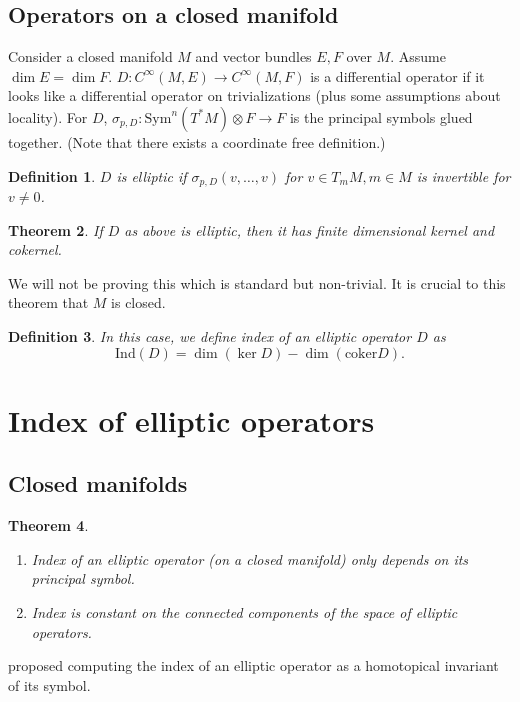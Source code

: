 \documentclass[11pt]{article}
\newcommand{\Sym}{\mathrm{Sym}}
\newcommand{\Ind}{\mathrm{Ind}}
\newcommand{\coker}{\mathrm{coker}}
\newtheorem{thm}{Theorem}
\newtheorem{defn}[thm]{Definition}
\begin{document}
\subsection*{Operators on a closed manifold}
Consider a closed manifold $M$ and vector bundles $E, F$ over $M$. Assume $\dim E = \dim F$. $D: C^\infty (M,E) \to C^\infty (M,F)$ is a differential operator if it looks like a differential operator on trivializations (plus some assumptions about locality). For $D$, $\sigma_{p,D} : \Sym^n (T^* M) \otimes F \to F$ is the principal symbols glued together. (Note that there exists a coordinate free definition.)

\begin{defn}$D$ is elliptic if $\sigma_{p,D} (v,\dots , v)$ for $v \in T_m M, m \in M$ is invertible for $v \neq 0$. 
\end{defn}

\begin{thm}
If $D$ as above is elliptic, then it has finite dimensional kernel and cokernel.
\end{thm}
We will not be proving this which is standard but non-trivial. It is crucial to this theorem that $M$ is closed.

\begin{defn}
In this case, we define index of an elliptic operator  $D$ as $$\Ind(D) = \dim (\ker D) -  \dim ( \coker D).$$
\end{defn}

\section*{Index of elliptic operators}

\subsection*{Closed manifolds}

\begin{thm} 
\begin{enumerate}
\item[a.] Index of an elliptic operator (on a closed manifold) only depends on its principal symbol.
\item[b.] Index is constant on the connected components of the space of elliptic operators.
\end{enumerate}
\end{thm}

 proposed computing the index of an elliptic operator as a homotopical invariant of its symbol.
\end{document}
